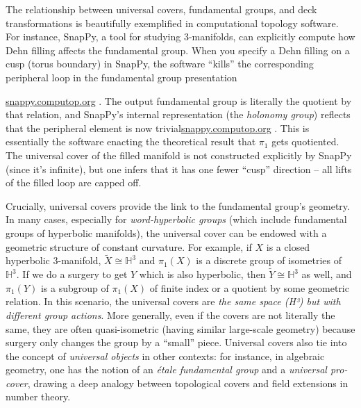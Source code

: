 \documentclass[11pt]{article}
\theoremstyle{remark}
\begin{document}
The relationship between universal covers, fundamental groups, and deck transformations is beautifully exemplified in computational topology software. For instance, SnapPy, a tool for studying 3-manifolds, can explicitly compute how Dehn filling affects the fundamental group. When you specify a Dehn filling on a cusp (torus boundary) in SnapPy, the software “kills” the corresponding peripheral loop in the fundamental group presentation

\href{https://snappy.computop.org/manifold.html#:~:text=Return%20a%20HolonomyGroup%20representing%20the,corresponding%20peripheral%20elements%20are%20killed}{snappy.computop.org}
. The output fundamental group is literally the quotient by that relation, and SnapPy’s internal representation (the \textit{holonomy group}) reflects that the peripheral element is now trivial\href{https://snappy.computop.org/manifold.html#:~:text=Return%20a%20HolonomyGroup%20representing%20the,corresponding%20peripheral%20elements%20are%20killed}{snappy.computop.org}
. This is essentially the software enacting the theoretical result that $\pi_1$ gets quotiented. The universal cover of the filled manifold is not constructed explicitly by SnapPy (since it’s infinite), but one infers that it has one fewer “cusp” direction – all lifts of the filled loop are capped off.

Crucially, universal covers provide the link to the fundamental group’s geometry. In many cases, especially for \textit{word-hyperbolic groups} (which include fundamental groups of hyperbolic manifolds), the universal cover can be endowed with a geometric structure of constant curvature. For example, if $X$ is a closed hyperbolic 3-manifold, $\widetilde{X}\cong \mathbb{H}^3$ and $\pi_1(X)$ is a discrete group of isometries of $\mathbb{H}^3$. If we do a surgery to get $Y$ which is also hyperbolic, then $\widetilde{Y}\cong \mathbb{H}^3$ as well, and $\pi_1(Y)$ is a subgroup of $\pi_1(X)$ of finite index or a quotient by some geometric relation. In this scenario, the universal covers are \textit{the same space (H³) but with different group actions}. More generally, even if the covers are not literally the same, they are often quasi-isometric (having similar large-scale geometry) because surgery only changes the group by a “small” piece. Universal covers also tie into the concept of \textit{universal objects} in other contexts: for instance, in algebraic geometry, one has the notion of an \textit{étale fundamental group} and a \textit{universal pro-cover}, drawing a deep analogy between topological covers and field extensions in number theory.
\end{document}
